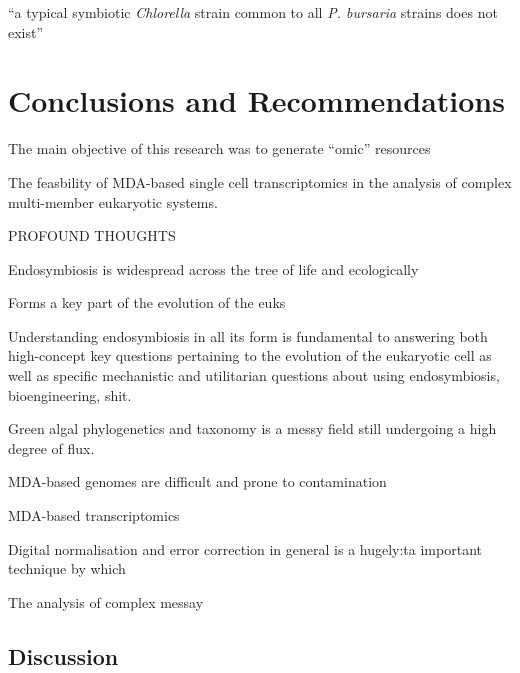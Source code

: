 \graphicspath{{chapters/7.Discussion/figures}}

\begin{savequote}[75mm]
    ``a typical symbiotic \textit{Chlorella} strain common to all \textit{P. bursaria}
    strains does not exist''
\end{savequote}

\chapter{Conclusions and Recommendations}

The main objective of this research was to generate ``omic'' resources


The feasbility of MDA-based single cell transcriptomics in the analysis
of complex multi-member eukaryotic systems.








PROFOUND THOUGHTS

Endosymbiosis 
is widespread across the tree of life and
ecologically

Forms a key part of the evolution of the euks


Understanding endosymbiosis in all its form is
fundamental to answering both high-concept key questions 
pertaining to the evolution
of the eukaryotic cell as well as specific mechanistic
and utilitarian questions about using
endosymbiosis, bioengineering, shit.


Green algal phylogenetics and taxonomy is a messy field still 
undergoing a high degree of flux. 

MDA-based genomes are difficult and prone to contamination 

MDA-based transcriptomics 


Digital normalisation and error correction in general is a hugely:ta
important technique by which 




The analysis of complex messay 


\section{Discussion}


\section{}

